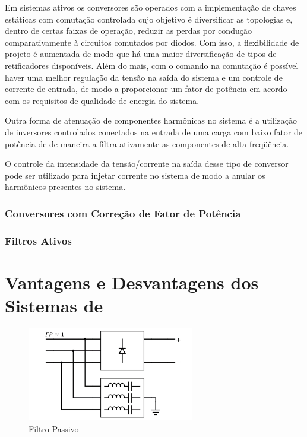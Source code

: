 Em sistemas ativos os conversores são operados com a implementação de chaves estáticas com comutação controlada cujo objetivo é diversificar as topologias e, dentro de certas faixas de operação, reduzir as perdas por condução comparativamente à circuitos comutados por diodos. Com isso, a flexibilidade de projeto é aumentada de modo que há uma maior diversificação de tipos de retificadores disponíveis. Além do mais, com o comando na comutação é possível haver uma melhor regulação da tensão na saída do sistema e um controle de corrente de entrada, de modo a proporcionar um fator de potência em acordo com os requisitos de qualidade de energia do sistema.

Outra forma de atenuação de componentes harmônicas no sistema é a utilização de inversores controlados conectados na entrada de uma carga com baixo fator de potência de de maneira a filtra ativamente as componentes de alta freqüência. 

O controle da intensidade da tensão/corrente na saída desse tipo de conversor pode ser utilizado para injetar corrente no sistema de modo a anular os harmônicos presentes no sistema.

\subsubsection{Conversores com Correção de Fator de Potência}

\subsubsection{Filtros Ativos}

\section{Vantagens e Desvantagens dos Sistemas de }

\begin{figure}[!htbp]
	\centering
	\includegraphics[width=0.65\textwidth]{Cap2/Figuras/sch_filtro_passivo.png}
	\caption{Filtro Passivo}
	\label{fig:sch_filtro_passivo}
\end{figure}

